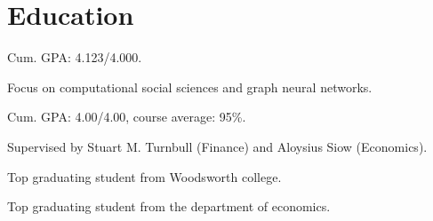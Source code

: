 \documentclass[letterpaper]{deedy-resume} %
\begin{document}
\begin{minipage}[t]{0.66\textwidth} %


\section{Education}


\vspace{\topsep} %
\begin{tightitemize}
\item Cum. GPA: 4.123/4.000.
\item Focus on computational social sciences and graph neural networks.
\end{tightitemize}

\sectionspace %



\begin{tightitemize}
\item Cum. GPA: 4.00/4.00, course average: 95\%.
\item Supervised by Stuart M. Turnbull (Finance) and Aloysius Siow (Economics).
\item Top graduating student from Woodsworth college.
\item Top graduating student from the department of economics.
\end{tightitemize}

\sectionspace %




\end{minipage}
\end{document}
